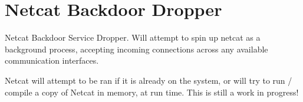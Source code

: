 \documentclass[IEEEtran,letterpaper,10pt,notitlepage,draftclsnofoot,onecolumn]{article}
\begin{document}
\section{Netcat Backdoor Dropper}
Netcat Backdoor Service Dropper. Will attempt to spin up netcat as a background process,
accepting incoming connections across any available communication interfaces.

Netcat will attempt to be ran if it is already on the system, or will try to run / compile a copy of Netcat
in memory, at run time. This is still a work in progress!
  






\end{document}
